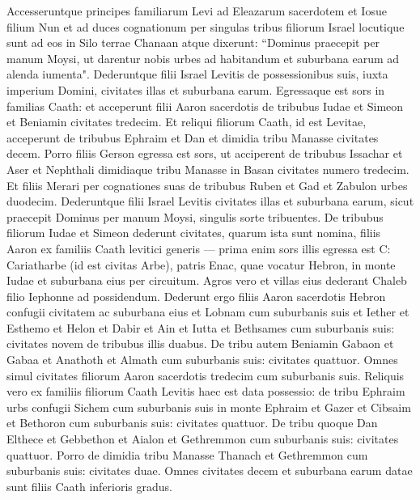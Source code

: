 \begin{biblechapter}  
\verse Accesseruntque principes familiarum Levi ad Eleazarum sacerdotem et Iosue filium Nun et ad duces cognationum per singulas tribus filiorum Israel 
\verse locutique sunt ad eos in Silo terrae Chanaan atque dixerunt: “Dominus praecepit per manum Moysi, ut darentur nobis urbes ad habitandum et suburbana earum ad alenda iumenta". 
\verse Dederuntque filii Israel Levitis de possessionibus suis, iuxta imperium Domini, civitates illas et suburbana earum. 
\verse Egressaque est sors in familias Caath: et acceperunt filii Aaron sacerdotis de tribubus Iudae et Simeon et Beniamin civitates tredecim. 
\verse Et reliqui filiorum Caath, id est Levitae, acceperunt de tribubus Ephraim et Dan et dimidia tribu Manasse civitates decem. 
\verse Porro filiis Gerson egressa est sors, ut acciperent de tribubus Issachar et Aser et Nephthali dimidiaque tribu Manasse in Basan civitates numero tredecim. 
\verse Et filiis Merari per cognationes suas de tribubus Ruben et Gad et Zabulon urbes duodecim. 
\verse Dederuntque filii Israel Levitis civitates illas et suburbana earum, sicut praecepit Dominus per manum Moysi, singulis sorte tribuentes. 
\verse De tribubus filiorum Iudae et Simeon dederunt civitates, quarum ista sunt nomina, 
\verse filiis Aaron ex familiis Caath levitici generis — prima enim sors illis egressa est C: 
\verse Cariatharbe (id est civitas Arbe), patris Enac, quae vocatur Hebron, in monte Iudae et suburbana eius per circuitum. 
\verse Agros vero et villas eius dederant Chaleb filio Iephonne ad possidendum. 
\verse Dederunt ergo filiis Aaron sacerdotis Hebron confugii civitatem ac suburbana eius et Lobnam cum suburbanis suis 
\verse et Iether et Esthemo 
\verse et Helon et Dabir 
\verse et Ain et Iutta et Bethsames cum suburbanis suis: civitates novem de tribubus illis duabus. 
\verse De tribu autem Beniamin Gabaon et Gabaa  
\verse et Anathoth et Almath cum suburbanis suis: civitates quattuor. 
\verse Omnes simul civitates filiorum Aaron sacerdotis tredecim cum suburbanis suis. 
\verse Reliquis vero ex familiis filiorum Caath Levitis haec est data possessio:  
\verse de tribu Ephraim urbs confugii Sichem cum suburbanis suis in monte Ephraim et Gazer 
\verse et Cibsaim et Bethoron cum suburbanis suis: civitates quattuor.  
\verse De tribu quoque Dan Elthece et Gebbethon 
\verse et Aialon et Gethremmon cum suburbanis suis: civitates quattuor. 
\verse Porro de dimidia tribu Manasse Thanach et Gethremmon cum suburbanis suis: civitates duae. 
\verse Omnes civitates decem et suburbana earum datae sunt filiis Caath inferioris gradus. 

\end{biblechapter}
